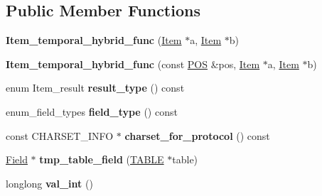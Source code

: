 \subsection*{Public Member Functions}
\begin{DoxyCompactItemize}
\item 
\mbox{\label{classItem__temporal__hybrid__func_a75f1b09e47b4c493749a49129b83ca95}} 
{\bfseries Item\+\_\+temporal\+\_\+hybrid\+\_\+func} (\mbox{\hyperlink{classItem}{Item}} $\ast$a, \mbox{\hyperlink{classItem}{Item}} $\ast$b)
\item 
\mbox{\label{classItem__temporal__hybrid__func_a69ce9d7536422ec8ebcf7047094a7a9d}} 
{\bfseries Item\+\_\+temporal\+\_\+hybrid\+\_\+func} (const \mbox{\hyperlink{structYYLTYPE}{P\+OS}} \&pos, \mbox{\hyperlink{classItem}{Item}} $\ast$a, \mbox{\hyperlink{classItem}{Item}} $\ast$b)
\item 
\mbox{\label{classItem__temporal__hybrid__func_adc27c567601fee38a11abfb8ec40ada6}} 
enum Item\+\_\+result {\bfseries result\+\_\+type} () const
\item 
\mbox{\label{classItem__temporal__hybrid__func_a42d538c7a3a248b39628aba2d94a454b}} 
enum\+\_\+field\+\_\+types {\bfseries field\+\_\+type} () const
\item 
\mbox{\label{classItem__temporal__hybrid__func_afda7d45270ba649e7f01018d164e8658}} 
const C\+H\+A\+R\+S\+E\+T\+\_\+\+I\+N\+FO $\ast$ {\bfseries charset\+\_\+for\+\_\+protocol} () const
\item 
\mbox{\label{classItem__temporal__hybrid__func_a4dc4cded0f7f356973d53582ab3494b7}} 
\mbox{\hyperlink{classField}{Field}} $\ast$ {\bfseries tmp\+\_\+table\+\_\+field} (\mbox{\hyperlink{structTABLE}{T\+A\+B\+LE}} $\ast$table)
\item 
\mbox{\label{classItem__temporal__hybrid__func_a44b9333719fb39e62d350f78794fc50a}} 
longlong {\bfseries val\+\_\+int} ()
\item 
\mbox{\label{classItem__temporal__hybrid__func_a121f0c87d9e1aaa61d1363352c01244d}} 

\end{DoxyCompactItemize}
